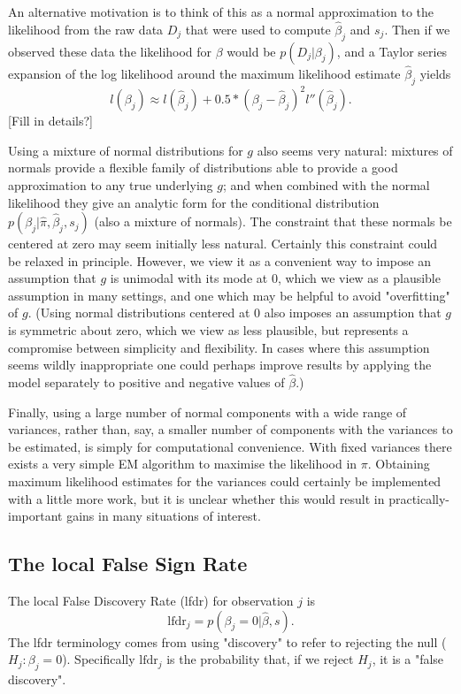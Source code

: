 \documentclass[10pt]{article}
\def\lfdr{\text{lfdr}}
\begin{document}
An alternative motivation is to think of this as a normal
approximation to the likelihood from the 
raw data $D_j$ that were used to compute
$\hat\beta_j$ and $s_j$. Then if we observed these data
the likelihood for $\beta$ would be 
$p(D_j | \beta_j)$, and a Taylor series expansion of the log likelihood around the maximum likelihood estimate $\hat\beta_j$  yields $$l(\beta_j) \approx l(\hat\beta_j) + 0.5* (\beta_j - \hat\beta_j)^2 l''(\hat\beta_j).$$ [Fill in details?]

Using a mixture of normal distributions for $g$ 
also seems very natural: mixtures of normals provide a flexible family of distributions able to provide a good approximation to any true underlying $g$; and 
when combined with the normal likelihood they give
an analytic form for the conditional distribution $p(\beta_j | \hat\pi, \hat\beta_j, s_j)$ (also a mixture of normals).
The constraint that these normals be centered at zero may seem initially less natural. 
Certainly this constraint could be relaxed in principle.
However, we view it as a convenient way to impose an assumption 
that $g$ is unimodal with its mode at 0,
which we view as a plausible assumption in many 
settings, and one which may be helpful to avoid
"overfitting" of $g$. (Using normal distributions centered at 0
also imposes an assumption
that $g$ is symmetric about zero, which we view as less
plausible, but represents a compromise between simplicity
and flexibility.
In cases where this assumption seems wildly inappropriate one could perhaps
improve results by applying the
model separately to positive and negative values of $\hat\beta$.) 


Finally, using a large number of normal components with a wide range of variances,
rather than, say, a smaller number of components with the variances
to be estimated, is simply for computational convenience. With fixed
variances there exists a very simple EM algorithm to maximise the likelihood
in $\pi$. Obtaining maximum likelihood estimates for the variances could certainly
be implemented with a little
more work, but it is unclear whether this would result in practically-important gains in many situations of interest. 

\subsection{The local False Sign Rate}

The local False Discovery Rate (lfdr) for observation $j$ is
\begin{equation}
\lfdr_j = p(\beta_j = 0 | \hat\beta, s).
\end{equation}
The lfdr terminology comes from using "discovery" to refer to rejecting the null ($H_j:\beta_j=0$).
Specifically $\lfdr_j$ is the probability that, if we reject $H_j$,
it is a  "false discovery".  
\end{document}
